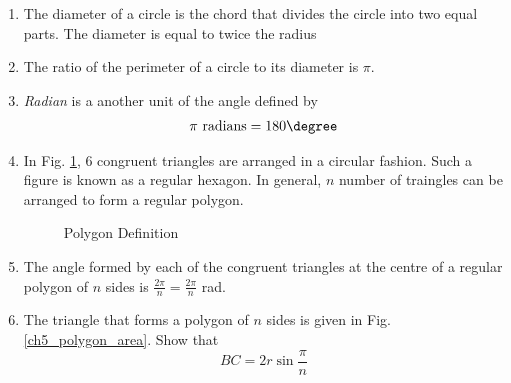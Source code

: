 %
%
\renewcommand{\theequation}{\theenumi}
\begin{enumerate}[label=\arabic*.,ref=\thesubsection.\theenumi]
%
%
\item
	The diameter of a circle is the chord that divides the circle into two equal parts. The diameter is equal to twice the radius
%
\item The ratio of the perimeter of a circle to its diameter is $\pi$.
\label{prob:circ_peri_dia}
\item {\em Radian} is a another unit of the angle defined by
%
\begin{align}
\pi \text{ radians} = 180 \degree
\end{align}
%
\item
	In Fig. \ref{ch5_polygon_def}, 6 congruent triangles are arranged in a circular fashion.  Such a figure is known as a regular hexagon.  In general, $n$ number of traingles can be arranged to form a regular polygon.
\begin{figure}[!ht]
	\begin{center}
		
		\resizebox{\columnwidth}{!}{}
	\end{center}
	\caption{Polygon Definition}
	\label{ch5_polygon_def}	
\end{figure}
%
\item
The angle formed by each of the congruent triangles at the centre of a regular polygon of $n$ sides is $\frac{2\pi}{n} = \frac{2\pi}{n}$ rad.
%
\item 	The triangle that forms a polygon of $n$ sides is given in Fig. \ref{ch5_polygon_area}. Show that 
%
\begin{equation}
BC = 2r \sin\frac{\pi}{n}
\label{eq:circ_chord_len}
\end{equation}
%

\begin{figure}[!ht]
	\begin{center}
		

\end{center}
\end{figure}
\end{enumerate}
